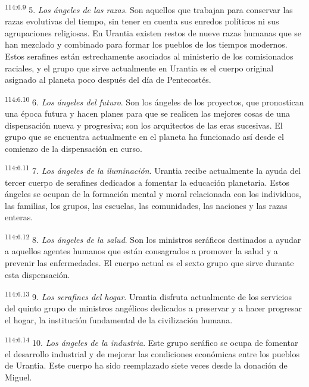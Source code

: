 \documentclass[twoside, 11pt]{book}
\begin{document}
\par
\textsuperscript{114:6.9} 5. \textit{Los ángeles de las razas}. Son aquellos que trabajan para conservar las razas evolutivas del tiempo, sin tener en cuenta sus enredos políticos ni sus agrupaciones religiosas. En Urantia existen restos de nueve razas humanas que se han mezclado y combinado para formar los pueblos de los tiempos modernos. Estos serafines están estrechamente asociados al ministerio de los comisionados raciales, y el grupo que sirve actualmente en Urantia es el cuerpo original asignado al planeta poco después del día de Pentecostés.

\par
\textsuperscript{114:6.10} 6. \textit{Los ángeles del futuro}. Son los ángeles de los proyectos, que pronostican una época futura y hacen planes para que se realicen las mejores cosas de una dispensación nueva y progresiva; son los arquitectos de las eras sucesivas. El grupo que se encuentra actualmente en el planeta ha funcionado así desde el comienzo de la dispensación en curso.

\par
\textsuperscript{114:6.11} 7. \textit{Los ángeles de la iluminación}. Urantia recibe actualmente la ayuda del tercer cuerpo de serafines dedicados a fomentar la educación planetaria. Estos ángeles se ocupan de la formación mental y moral relacionada con los individuos, las familias, los grupos, las escuelas, las comunidades, las naciones y las razas enteras.

\par
\textsuperscript{114:6.12} 8. \textit{Los ángeles de la salud}. Son los ministros seráficos destinados a ayudar a aquellos agentes humanos que están consagrados a promover la salud y a prevenir las enfermedades. El cuerpo actual es el sexto grupo que sirve durante esta dispensación.

\par
\textsuperscript{114:6.13} 9. \textit{Los serafines del hogar}. Urantia disfruta actualmente de los servicios del quinto grupo de ministros angélicos dedicados a preservar y a hacer progresar el hogar, la institución fundamental de la civilización humana.

\par
\textsuperscript{114:6.14} 10. \textit{Los ángeles de la industria}. Este grupo seráfico se ocupa de fomentar el desarrollo industrial y de mejorar las condiciones económicas entre los pueblos de Urantia. Este cuerpo ha sido reemplazado siete veces desde la donación de Miguel.
\end{document}
